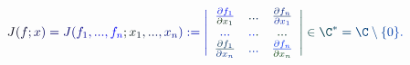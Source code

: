 \documentclass[12pt]{article}
\begin{document}
\makeatletter
\renewcommand*{\@textcolor}[3]{%
  \protect\leavevmode
  \begingroup
    \color#1{#2}#3%
  \endgroup
}
\makeatother
\begin{displaymath}
\mathcolor[RGB]{0,0,15}{J} \mathcolor[RGB]{0,0,30}{(} \mathcolor[RGB]{0,0,45}{f} \mathcolor[RGB]{0,0,60}{;} \mathcolor[RGB]{0,0,75}{x} \mathcolor[RGB]{0,0,90}{)} \mathcolor[RGB]{0,0,105}{=
J} \mathcolor[RGB]{0,0,120}{(} \mathcolor[RGB]{0,0,135}{f} _ { \mathcolor[RGB]{0,0,150}{1} } \mathcolor[RGB]{0,0,165}{,} \mathcolor[RGB]{0,0,180}{.} \mathcolor[RGB]{0,0,195}{.} \mathcolor[RGB]{0,0,210}{.} \mathcolor[RGB]{0,0,225}{,} \mathcolor[RGB]{0,0,240}{f} _ { \mathcolor[RGB]{0,0,255}{n} } \mathcolor[RGB]{0,15,0}{;} \mathcolor[RGB]{0,15,15}{x} _ { \mathcolor[RGB]{0,15,30}{1} } \mathcolor[RGB]{0,15,45}{,} \mathcolor[RGB]{0,15,60}{.} \mathcolor[RGB]{0,15,75}{.} \mathcolor[RGB]{0,15,90}{.} \mathcolor[RGB]{0,15,105}{,} \mathcolor[RGB]{0,15,120}{x} _ { \mathcolor[RGB]{0,15,135}{n} } \mathcolor[RGB]{0,15,150}{)} \mathcolor[RGB]{0,15,165}{:} \mathcolor[RGB]{0,15,180}{=} \mathcolor[RGB]{0,15,195}{\left|} \begin{array} {ccc} { \mathcolor[RGB]{0,15,210}{\frac { \mathcolor[RGB]{0,15,225}{\partial} \mathcolor[RGB]{0,15,240}{f} _ { \mathcolor[RGB]{0,15,255}{1} } } { \mathcolor[RGB]{0,30,0}{\partial} \mathcolor[RGB]{0,30,15}{x} _ { \mathcolor[RGB]{0,30,30}{1} } } } } & { \mathcolor[RGB]{0,30,45}{.} \mathcolor[RGB]{0,30,60}{.} \mathcolor[RGB]{0,30,75}{.} } & { \mathcolor[RGB]{0,30,90}{\frac { \mathcolor[RGB]{0,30,105}{\partial} \mathcolor[RGB]{0,30,120}{f} _ { \mathcolor[RGB]{0,30,135}{n} } } { \mathcolor[RGB]{0,30,150}{\partial} \mathcolor[RGB]{0,30,165}{x} _ { \mathcolor[RGB]{0,30,180}{1} } } } } \\ { \mathcolor[RGB]{0,30,195}{.} \mathcolor[RGB]{0,30,210}{.} \mathcolor[RGB]{0,30,225}{.} } & { \mathcolor[RGB]{0,30,240}{.} \mathcolor[RGB]{0,30,255}{.} \mathcolor[RGB]{0,45,0}{.} } & { \mathcolor[RGB]{0,45,15}{.} \mathcolor[RGB]{0,45,30}{.} \mathcolor[RGB]{0,45,45}{.} } \\ { \mathcolor[RGB]{0,45,60}{\frac { \mathcolor[RGB]{0,45,75}{\partial} \mathcolor[RGB]{0,45,90}{f} _ { \mathcolor[RGB]{0,45,105}{1} } } { \mathcolor[RGB]{0,45,120}{\partial} \mathcolor[RGB]{0,45,135}{x} _ { \mathcolor[RGB]{0,45,150}{n} } } } } & { \mathcolor[RGB]{0,45,165}{.} \mathcolor[RGB]{0,45,180}{.} \mathcolor[RGB]{0,45,195}{.} } & { \mathcolor[RGB]{0,45,210}{\frac { \mathcolor[RGB]{0,45,225}{\partial} \mathcolor[RGB]{0,45,240}{f} _ { \mathcolor[RGB]{0,45,255}{n} } } { \mathcolor[RGB]{0,60,0}{\partial} \mathcolor[RGB]{0,60,15}{x} _ { \mathcolor[RGB]{0,60,30}{n} } } } } \end{array} \mathcolor[RGB]{0,60,45}{\right|} \mathcolor[RGB]{0,60,60}{\in} \mathcolor[RGB]{0,60,75}{\C} ^ { \mathcolor[RGB]{0,60,90}{*} } \mathcolor[RGB]{0,60,105}{=} \mathcolor[RGB]{0,60,120}{\C} \mathcolor[RGB]{0,60,135}{\setminus} \mathcolor[RGB]{0,60,150}{\{} \mathcolor[RGB]{0,60,165}{0} \mathcolor[RGB]{0,60,180}{\}} \mathcolor[RGB]{0,60,195}{.}
\end{displaymath}
\end{document}
